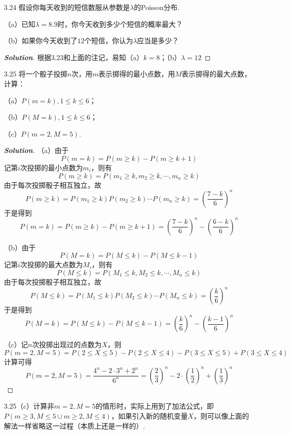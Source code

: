 \documentclass[10pt, a4paper, oneside]{ctexart}
\newenvironment{solution}{\begin{proof}[\bf Solution]}{\end{proof}}
\begin{document}
3.24 假设你每天收到的短信数服从参数是$\lambda$的Poisson分布.

（a）已知$\lambda=8.9$时，你今天收到多少个短信的概率最大？

（b）如果你今天收到了$12$个短信，你认为$\lambda$应当是多少？
\begin{solution}
根据3.23和上面的注记，易知（a）$k=8$；（b）$\lambda=12$
\end{solution}

3.25 将一个骰子投掷$n$次，用$m$表示掷得的最小点数，用$M$表示掷得的最大点数，计算：

（a）$P(m=k),1\leqslant k\leqslant 6$；

（b）$P(M=k),1\leqslant k\leqslant 6$；

（c）$P(m=2,M=5)$.
\begin{solution}
（a）由于\[P(m = k) = P(m \geqslant k) - P(m \geqslant k + 1)\]
记第$i$次投掷的最小点数为$m_i$，则有
\[P(m \geqslant k) = P({m_1} \geqslant k,{m_2} \geqslant k, \cdots ,{m_n} \geqslant k)\]
由于每次投掷骰子相互独立，故
\[P(m \geqslant k) = P({m_1} \geqslant k)P({m_2} \geqslant k) \cdots P({m_n} \geqslant k) = {\left( {\frac{{7 - k}}{6}} \right)^n}\]
于是得到
\[P(m = k) = P(m \geqslant k) - P(m \geqslant k + 1) = {\left( {\frac{{7 - k}}{6}} \right)^n} - {\left( {\frac{{6 - k}}{6}} \right)^n}\]

（b）由于
\[P(M = k) = P(M \leqslant k) - P(M \leqslant k - 1)\]
记第$i$次投掷的最大点数为$M_i$，则有
\[P(M \leqslant k) = P({M_1} \leqslant k,{M_2} \leqslant k, \cdots ,{M_n} \leqslant k)\]
由于每次投掷骰子相互独立，故
\[P(M \leqslant k) = P({M_1} \leqslant k)P({M_2} \leqslant k) \cdots P({M_n} \leqslant k) = {\left( {\frac{k}{6}} \right)^n}\]
于是得到
\[P(M = k) = P(M \leqslant k) - P(M \leqslant k - 1) = {\left( {\frac{k}{6}} \right)^n} - {\left( {\frac{{k - 1}}{6}} \right)^n}\]

（c）记$n$次投掷出现过的点数为$X$，则
\[P(m = 2,M = 5) = P(2 \leqslant X \leqslant 5) - P(2 \leqslant X \leqslant 4) - P(3 \leqslant X \leqslant 5) + P(3 \leqslant X \leqslant 4)\]
计算可得
\[P(m = 2,M = 5) = \frac{{{4^n} - 2 \cdot {3^n} + {2^n}}}{{{6^n}}} = {\left( {\frac{2}{3}} \right)^n} - 2 \cdot {\left( {\frac{1}{2}} \right)^n} + {\left( {\frac{1}{3}} \right)^n}\]
\end{solution}
\begin{remark}
3.25（c）计算非$m=2,M=5$的情形时，实际上用到了加法公式，即$P(m \geqslant 3,M \leqslant 5 \cup m \geqslant 2,M \leqslant 4)$，如果引入新的随机变量$X$，则可以像上面的解法一样省略这一过程（本质上还是一样的）.
\end{remark}
\end{document}
